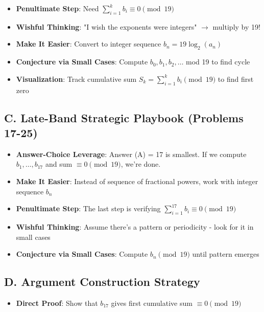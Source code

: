 \documentclass[11pt]{article}
\begin{document}
\begin{strategicbox}
\begin{itemize}[leftmargin=*]
    \item \textbf{Penultimate Step}: Need $\sum_{i=1}^{k} b_i \equiv 0 \pmod{19}$
    
    \item \textbf{Wishful Thinking}: "I wish the exponents were integers" $\rightarrow$ multiply by 19!
    
    \item \textbf{Make It Easier}: Convert to integer sequence $b_n = 19\log_2(a_n)$
    
    \item \textbf{Conjecture via Small Cases}: Compute $b_0, b_1, b_2, \ldots$ mod 19 to find cycle
    
    \item \textbf{Visualization}: Track cumulative sum $S_k = \sum_{i=1}^{k} b_i \pmod{19}$ to find first zero
\end{itemize}

\subsection*{C. Late-Band Strategic Playbook (Problems 17-25)}
\begin{itemize}[leftmargin=*]
    \item \textbf{Answer-Choice Leverage}: Answer (A) = 17 is smallest. If we compute $b_1, \ldots, b_{17}$ and sum $\equiv 0 \pmod{19}$, we're done.
    
    \item \textbf{Make It Easier}: Instead of sequence of fractional powers, work with integer sequence $b_n$
    
    \item \textbf{Penultimate Step}: The last step is verifying $\sum_{i=1}^{17} b_i \equiv 0 \pmod{19}$
    
    \item \textbf{Wishful Thinking}: Assume there's a pattern or periodicity - look for it in small cases
    
    \item \textbf{Conjecture via Small Cases}: Compute $b_n \pmod{19}$ until pattern emerges
\end{itemize}

\subsection*{D. Argument Construction Strategy}
\begin{itemize}[leftmargin=*]
    \item \textbf{Direct Proof}: Show that $b_{17}$ gives first cumulative sum $\equiv 0 \pmod{19}$
    

\end{itemize}
\end{strategicbox}
\end{document}
